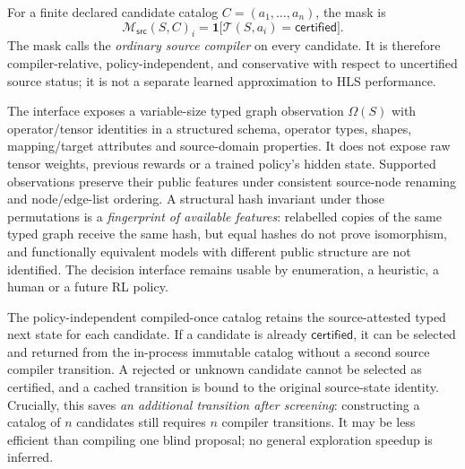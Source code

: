 \documentclass{article}
\newcommand{\cert}{\mathsf{certified}}
\newcommand{\src}{\mathsf{src}}
\begin{document}
For a finite declared candidate catalog $C=(a_1,\ldots,a_n)$, the mask is
\begin{equation}
\mathcal{M}_{\src}(S,C)_i
=\mathbf 1\bigl[\mathcal{T}(S,a_i)=\cert\bigr].
\label{eq:mask}
\end{equation}
The mask calls the \emph{ordinary source compiler} on every candidate. It is therefore compiler-relative, policy-independent, and conservative with respect to uncertified source status; it is not a separate learned approximation to HLS performance.


The interface exposes a variable-size typed graph observation $\Omega(S)$ with operator/tensor identities in a structured schema, operator types, shapes, mapping/target attributes and source-domain properties. It does not expose raw tensor weights, previous rewards or a trained policy's hidden state. Supported observations preserve their public features under consistent source-node renaming and node/edge-list ordering. A structural hash invariant under those permutations is a \emph{fingerprint of available features}: relabelled copies of the same typed graph receive the same hash, but equal hashes do not prove isomorphism, and functionally equivalent models with different public structure are not identified. The decision interface remains usable by enumeration, a heuristic, a human or a future RL policy.


The policy-independent compiled-once catalog retains the source-attested typed next state for each candidate. If a candidate is already $\cert$, it can be selected and returned from the in-process immutable catalog without a second source compiler transition. A rejected or unknown candidate cannot be selected as certified, and a cached transition is bound to the original source-state identity. Crucially, this saves \emph{an additional transition after screening}: constructing a catalog of $n$ candidates still requires $n$ compiler transitions. It may be less efficient than compiling one blind proposal; no general exploration speedup is inferred.
\end{document}

